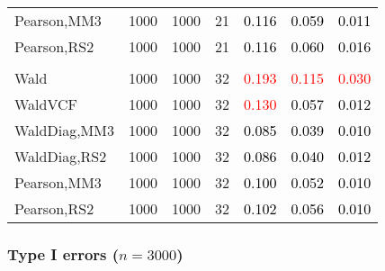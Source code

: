 \documentclass[
]{article}
\begin{document}
\begin{table}[H]
{\begin{tabular}[t]{lrrrrrr}
\hspace{1em}Pearson,MM3 & 1000 & 1000 & 21 & \textcolor{black}{0.116} & \textcolor{black}{0.059} & \textcolor{black}{0.011}\\
\hspace{1em}Pearson,RS2 & 1000 & 1000 & 21 & \textcolor{black}{0.116} & \textcolor{black}{0.060} & \textcolor{black}{0.016}\\
\addlinespace[0.3em]
\multicolumn{7}{l}{\textbf{3F 15V}}\\
\hspace{1em}Wald & 1000 & 1000 & 32 & \textcolor{red}{0.193} & \textcolor{red}{0.115} & \textcolor{red}{0.030}\\
\hspace{1em}WaldVCF & 1000 & 1000 & 32 & \textcolor{red}{0.130} & \textcolor{black}{0.057} & \textcolor{black}{0.012}\\
\hspace{1em}WaldDiag,MM3 & 1000 & 1000 & 32 & \textcolor{black}{0.085} & \textcolor{black}{0.039} & \textcolor{black}{0.010}\\
\hspace{1em}WaldDiag,RS2 & 1000 & 1000 & 32 & \textcolor{black}{0.086} & \textcolor{black}{0.040} & \textcolor{black}{0.012}\\
\hspace{1em}Pearson,MM3 & 1000 & 1000 & 32 & \textcolor{black}{0.100} & \textcolor{black}{0.052} & \textcolor{black}{0.010}\\
\hspace{1em}Pearson,RS2 & 1000 & 1000 & 32 & \textcolor{black}{0.102} & \textcolor{black}{0.056} & \textcolor{black}{0.010}\\
\bottomrule
\end{tabular}}
\endgroup{}
\end{table}

\hypertarget{type-i-errors-n3000-2}{%
\subsubsection{\texorpdfstring{Type I errors
(\(n=3000\))}{Type I errors (n=3000)}}\label{type-i-errors-n3000-2}}
\end{document}
